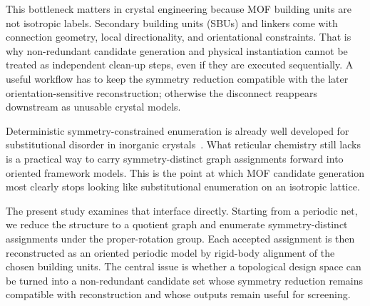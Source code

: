 \documentclass[pdflatex,sn-mathphys-num]{sn-jnl}
\theoremstyle{thmstyleone}%
\begin{document}
This bottleneck matters in crystal engineering because MOF building units are not isotropic labels. Secondary building units (SBUs) and linkers come with connection geometry, local directionality, and orientational constraints. That is why non-redundant candidate generation and physical instantiation cannot be treated as independent clean-up steps, even if they are executed sequentially. A useful workflow has to keep the symmetry reduction compatible with the later orientation-sensitive reconstruction; otherwise the disconnect reappears downstream as unusable crystal models.

Deterministic symmetry-constrained enumeration is already well developed for substitutional disorder in inorganic crystals~\cite{mckay1998isomorph, mckay2014practical, hart2008algorithm, hart2009generating, hart2012generating, morgan2017generating}. What reticular chemistry still lacks is a practical way to carry symmetry-distinct graph assignments forward into oriented framework models. This is the point at which MOF candidate generation most clearly stops looking like substitutional enumeration on an isotropic lattice.

The present study examines that interface directly. Starting from a periodic net, we reduce the structure to a quotient graph and enumerate symmetry-distinct assignments under the proper-rotation group. Each accepted assignment is then reconstructed as an oriented periodic model by rigid-body alignment of the chosen building units. The central issue is whether a topological design space can be turned into a non-redundant candidate set whose symmetry reduction remains compatible with reconstruction and whose outputs remain useful for screening.
\end{document}

